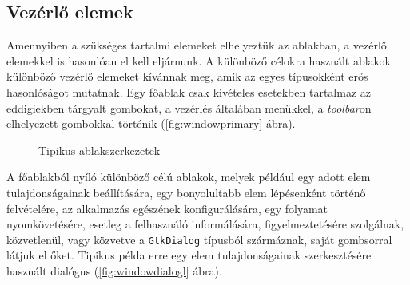 \subsection{Vezérlő elemek}
\label{sec:windowvsdialog}

Amennyiben a szükséges tartalmi elemeket elhelyeztük az ablakban, a vezérlő elemekkel is hasonlóan el kell eljárnunk. A különböző célokra használt ablakok különböző vezérlő elemeket kívánnak meg, amik az egyes típusokként erős hasonlóságot mutatnak. Egy főablak csak kivételes esetekben tartalmaz az eddigiekben tárgyalt gombokat, a vezérlés általában menükkel, a \textit{toolbar}on elhelyezett gombokkal történik (\ref{fig:windowprimary} ábra).

\begin{figure}[H]
\begin{center}
\hspace{12pt}
\caption{Tipikus ablakszerkezetek}
\end{center}
\end{figure}

A főablakból nyíló különböző célú ablakok, melyek például egy adott elem tulajdonságainak beállítására, egy bonyolultabb elem lépésenként történő felvételére, az alkalmazás egészének konfigurálására, egy folyamat nyomkövetésére, esetleg a felhasználó informálására, figyelmeztetésére szolgálnak, közvetlenül, vagy közvetve a \texttt{GtkDialog} típusból szármáznak, saját gombsorral látjuk el őket. Tipikus példa erre egy elem tulajdonságainak szerkesztésére használt dialógus (\ref{fig:windowdialogl} ábra).

